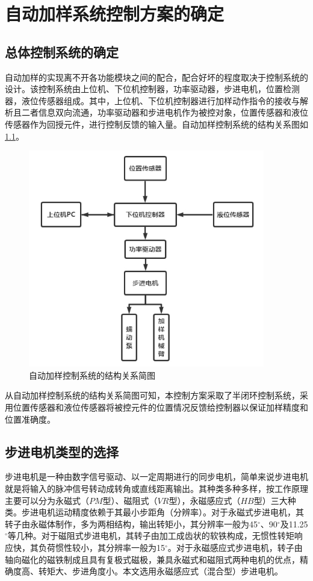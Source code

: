 \chapter{自动加样系统控制方案的确定}
\section{总体控制系统的确定}
自动加样的实现离不开各功能模块之间的配合，配合好坏的程度取决于控制系统的设计。该控制系统由上位机、下位机控制器，功率驱动器，步进电机，位置检测器，液位传感器组成。其中，上位机、下位机控制器进行加样动作指令的接收与解析且二者信息双向流通，功率驱动器和步进电机作为被控对象，位置传感器和液位传感器作为回授元件，进行控制反馈的输入量。自动加样控制系统的结构关系图如\ref{fig:4-1}。

\begin{figure}[htbp!]
	\centering
	\includegraphics[height=9.5cm]{chap/figure/4-1.jpg}
	\caption{自动加样控制系统的结构关系简图}
	\label{fig:4-1}
\end{figure}

从自动加样控制系统的结构关系简图可知，本控制方案采取了半闭环控制系统，采用位置传感器和液位传感器将被控元件的位置情况反馈给控制器以保证加样精度和位置准确度。

\section{步进电机类型的选择}
步进电机是一种由数字信号驱动、以一定周期进行的同步电机，简单来说步进电机就是将输入的脉冲信号转动成转角或直线距离输出。其种类多种多样，按工作原理主要可以分为永磁式（$PM$型）、磁阻式（$VR$型），永磁感应式（$HB$型）三大种类\supercite{bib12}。步进电机运动精度依赖于其最小步距角（分辨率）。对于永磁式步进电机，其转子由永磁体制作，多为两相结构，输出转矩小，其分辨率一般为45$^ \circ $、90$^ \circ $及11.25$^ \circ $等几种。对于磁阻式步进电机，其转子由加工成齿状的软铁构成，无惯性转矩响应快，其负荷惯性较小，其分辨率一般为15$^ \circ $。对于永磁感应式步进电机，转子由轴向磁化的磁铁制成且具有复极式磁极，兼具永磁式和磁阻式两种电机的优点，精确度高、转矩大、步进角度小。本文选用永磁感应式（混合型）步进电机。

